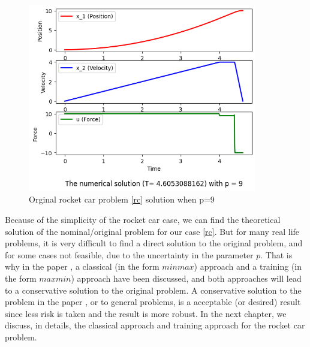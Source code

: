 \documentclass  [
  paper    = a4,
  BCOR     = 10mm,
  twoside,
  fontsize = 12pt,
  fleqn,
  toc      = bibnumbered,
  toc      = listofnumbered,
  numbers  = noendperiod,
  headings = normal,
  listof   = leveldown,
  version  = 3.03
]                                       {scrreprt}
\newcommand{\<}{\langle}
\renewcommand{\>}{\rangle}
\begin{document}
\begin{figure}[H]
	\centerline{\includegraphics[width=10cm]{original_u10_p9.png}}
	\caption{Orginal rocket car problem \ref{rc} solution when p=9}
	\label{fig1_org_u10_p9}
\end{figure}


Because of the simplicity of the rocket car case, we can find the theoretical solution of the nominal/original problem for our case \ref{rc}. But for many real life problems, it is very difficult to find a direct solution to the original problem, and for some cases not feasible, due to the uncertainty in the parameter $p$. That is why in the paper \cite{MatSch22}, a classical (in the form $minmax$) approach and a training (in the form $maxmin$) approach have been discussed, and both approaches will lead to a conservative solution to the original problem. A conservative solution to the problem in the paper \cite{MatSch22}, or to general problems,  is a acceptable (or desired) result since less risk is taken and the result is more robust. In the next chapter, we discuss, in details, the classical approach and training approach for the rocket car problem. %
\end{document}
